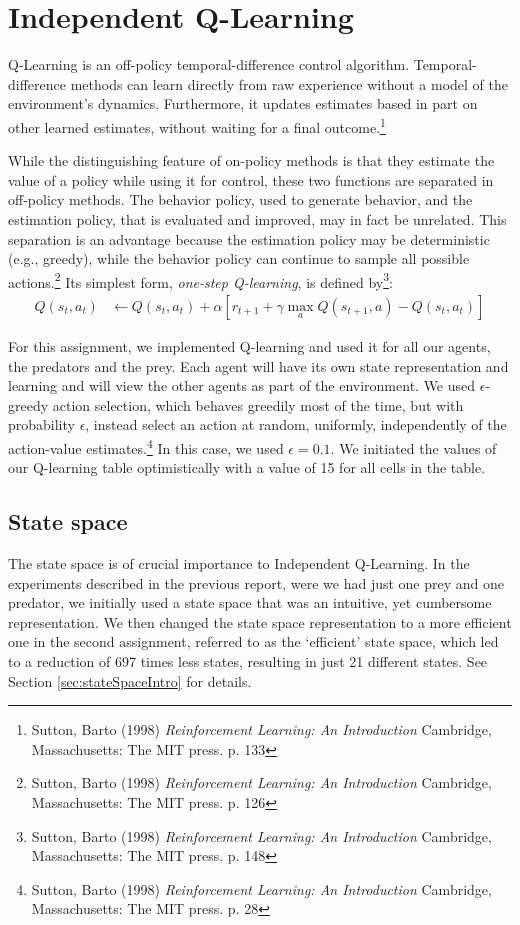 \section{Independent Q-Learning}\label{sec:IQL}
Q-Learning is an off-policy temporal-difference control algorithm. Temporal-difference methods can learn directly from raw experience without a model of the environment's dynamics. Furthermore, it updates estimates based in part on other learned estimates, without waiting for a final outcome.\footnote{Sutton, Barto (1998) \textit{Reinforcement Learning: An Introduction} Cambridge, Massachusetts: The MIT press. p. 133}

While the distinguishing feature of on-policy methods is that they estimate the value of a policy while using it for control, these two functions are separated in off-policy methods. The behavior policy, used to generate behavior, and the estimation policy, that is evaluated and improved, may in fact be unrelated. This separation is an advantage because the estimation policy may be deterministic (e.g., greedy), while the behavior policy can continue to sample all possible actions.\footnote{Sutton, Barto (1998) \textit{Reinforcement Learning: An Introduction} Cambridge, Massachusetts: The MIT press. p. 126} Its simplest form, \textit{one-step Q-learning}, is defined by\footnote{Sutton, Barto (1998) \textit{Reinforcement Learning: An Introduction} Cambridge, Massachusetts: The MIT press. p. 148}:
\begin{align*}
Q(s_t,a_t) & \leftarrow Q(s_t,a_t) + \alpha \left[ r_{t+1} + \gamma \displaystyle\max_a Q(s_{t+1},a) - Q(s_t,a_t) \right]
\end{align*}

For this assignment, we implemented Q-learning and used it for all our agents, the predators and the prey. Each agent will have its own state representation and learning and will view the other agents as part of the environment. We used $\epsilon$-greedy action selection, which behaves greedily most of the time, but with probability $\epsilon$, instead select an action at random, uniformly, independently of the action-value estimates.\footnote{Sutton, Barto (1998) \textit{Reinforcement Learning: An Introduction} Cambridge, Massachusetts: The MIT press. p. 28} In this case, we used $\epsilon = 0.1$. We initiated the values of our Q-learning table optimistically with a value of 15 for all cells in the table.

\subsection{State space} \label{sec:stateSpaceIQL}
The state space is of crucial importance to Independent Q-Learning. In the experiments described in the previous report, were we had just one prey and one predator, we initially used a state space that was an intuitive, yet cumbersome representation. We then changed the state space representation to a more efficient one in the second assignment, referred to as the `efficient' state space, which led to a reduction of 697 times less states, resulting in just 21 different states. See Section \ref{sec:stateSpaceIntro} for details.

